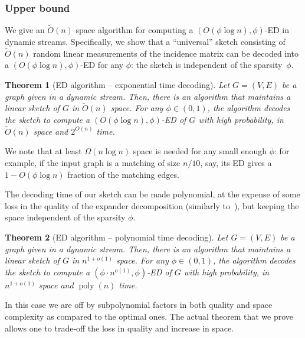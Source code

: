 \documentclass[epsfig,letter,11pt]{article}
\numberwithin{equation}{section}
\newcommand{\otil}{\tilde{O}}
\renewcommand{\tilde}{\widetilde}
\DeclareMathOperator*{\poly}{poly}
\newtheorem{mainthsimple}{Theorem}
\begin{document}
\subsubsection*{Upper bound}
We give an $\otil(n)$ space algorithm for computing a $(O(\phi \log n), \phi)$-ED in dynamic streams. Specifically, we show that a ``universal'' sketch consisting of $\otil(n)$ random linear measurements of the incidence matrix can be decoded into a $(O(\phi \log n), \phi)$-ED for any $\phi$: the sketch is independent of the sparsity~$\phi$.

\begin{mainthsimple}[ED algorithm -- exponential time decoding]
	\label{cor:main}
	Let $G=(V,E)$ be a graph given in a dynamic stream. Then, there is an algorithm that maintains a linear sketch of $G$ in $\otil(n)$ space. For any $\phi \in (0,1)$, the algorithm decodes the sketch to compute a $(O(\phi \log n), \phi)$-ED of $G$ with high probability, in $\otil(n)$ space and $2^{O(n)}$ time.
\end{mainthsimple}

\noindent
We note that at least $\Omega(n\log n)$ space is needed for any small enough $\phi$: for example, if the input graph is a matching of size $n/10$, say, its ED gives a $1-O(\phi \log n)$ fraction of the matching edges. 

The decoding time of our sketch can be made polynomial, at the expense of some loss in the quality of the expander decomposition (similarly to~\cite{streamexpdec}), but keeping the space independent of the sparsity $\phi$.

\begin{mainthsimple}[ED algorithm -- polynomial time decoding]
	\label{cor:mainpoly}
	Let $G=(V,E)$ be a graph given in a dynamic stream. Then, there is an algorithm that maintains a linear sketch of $G$ in $n^{1+o(1)}$ space. For any $\phi \in (0,1)$, the algorithm decodes the sketch to compute a $(\phi \cdot n^{o(1)}, \phi)$-ED of $G$ with high probability, in $n^{1+o(1)}$ space and $\poly(n)$ time.
\end{mainthsimple}

\noindent
In this case we are off by subpolynomial factors in both quality and space complexity as compared to the optimal ones. The actual theorem that we prove allows one to trade-off the loss in quality and increase in space.
\end{document}
